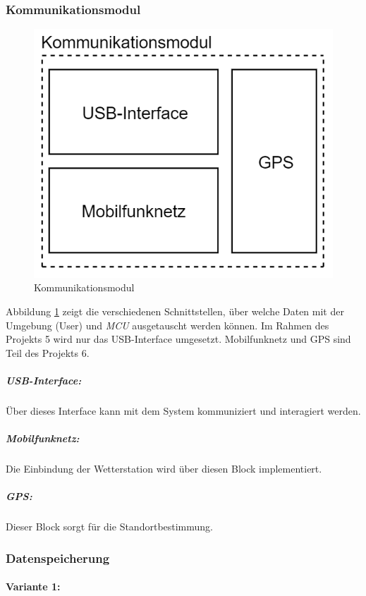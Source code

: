 \subsubsection{Kommunikationsmodul}
\begin{figure}[h]
\centering
\includegraphics[scale=0.7]{graphics/Kommunikationsmodul.PNG}
\caption{Kommunikationsmodul}
\label{fig:kommunikationsmodul}
\end{figure}
Abbildung \ref{fig:kommunikationsmodul} zeigt die verschiedenen Schnittstellen, über welche Daten mit der Umgebung (User) und \textit{MCU} ausgetauscht werden können. Im Rahmen des Projekts 5 wird nur das USB-Interface umgesetzt. Mobilfunknetz und GPS sind Teil des Projekts 6.\\

\subparagraph{USB-Interface:}
Über dieses Interface kann mit dem System kommuniziert und interagiert werden.\\

\subparagraph{Mobilfunknetz:}
Die Einbindung der Wetterstation wird über diesen Block implementiert.\\

\subparagraph{GPS:}
Dieser Block sorgt für die Standortbestimmung.\\

\subsubsection{Datenspeicherung}
\paragraph{Variante 1:}

